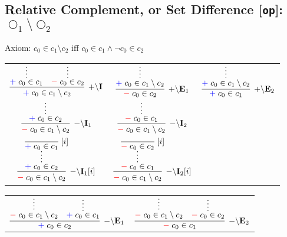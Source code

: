 \documentclass[11pt]{article}
\begin{document}
\newpage
\subsection*{Relative Complement, or Set Difference [\texttt{op}]: $\bigcirc_1\setminus\bigcirc_2$}

\smallskip
\noindent
Axiom: $c_0\in c_1\setminus c_2\text{ iff }c_0\in c_1\land \lnot c_0\in c_2$
\smallskip

\noindent
\begin{tabular}{ccc}
$
\infer[\AssertRule{\setminus}\Intro{}]{\Assert{c_0\in c_1\setminus c_2}}{
	\infer*{\Assert{c_0\in c_1}}{}
	&
	\infer*{\Deny{c_0\in c_2}}{}
}
$
\hspace{1cm}
&
$
\infer[\AssertRule{\setminus}\Elim{1}]{\Deny{c_0\in c_2}}{
	\infer*{\Assert{c_0\in c_1\setminus c_2}}{}
}
$
\hspace{1cm}
&
$
\infer[\AssertRule{\setminus}\Elim{2}]{\Assert{c_0\in c_1}}{
	\infer*{\Assert{c_0\in c_1\setminus c_2}}{}
}
$
\\[2mm]
$
\infer[\DenyRule{\setminus}\Intro{1}]{\Deny{c_0\in c_1\setminus c_2}}{
	\infer*{\Assert{c_0\in c_2}}{}
}
$
\hspace{1cm}
&
$
\infer[\DenyRule{\setminus}\Intro{2}]{\Deny{c_0\in c_1\setminus c_2}}{
	\infer*{\Deny{c_0\in c_1}}{}
}
$
\hspace{1cm}
\\[4mm]
$
\infer[\DenyRule{\setminus}\Intro{1}{[i]}]{\Deny{c_0\in c_1\setminus c_2}}{
	\infer*{\Assert{c_0\in c_2}}{\infer[\Label{i}]{\Assert{c_0\in c_1}}{}}
}
$
\hspace{1cm}
&
$
\infer[\DenyRule{\setminus}\Intro{2}{[i]}]{\Deny{c_0\in c_1\setminus c_2}}{
	\infer*{\Deny{c_0\in c_1}}{\infer[\Label{i}]{\Deny{c_0\in c_2}}{}}
}
$
\hspace{1cm}
\end{tabular}
\bigskip

\noindent
\begin{tabular}{cc}
$
\infer[\DenyRule{\setminus}\Elim{1}]{\Assert{c_0\in c_2}}{
	\infer*{\Deny{c_0\in c_1\setminus c_2}}{}
	&
	\infer*{\Assert{c_0\in c_1}}{}
}
$
\hspace{1cm}
&
$
\infer[\DenyRule{\setminus}\Elim{2}]{\Deny{c_0\in c_1}}{
	\infer*{\Deny{c_0\in c_1\setminus c_2}}{}
	&
	\infer*{\Deny{c_0\in c_2}}{}
}
$
\end{tabular}
\bigskip
\end{document}
